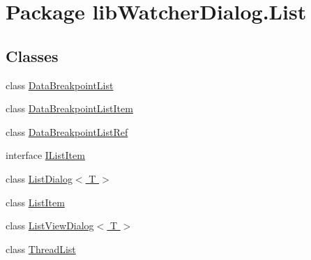 \hypertarget{namespacelib_watcher_dialog_1_1_list}{\section{Package lib\+Watcher\+Dialog.\+List}
\label{namespacelib_watcher_dialog_1_1_list}
}
\subsection*{Classes}
\begin{DoxyCompactItemize}
\item 
class \hyperlink{classlib_watcher_dialog_1_1_list_1_1_data_breakpoint_list}{Data\+Breakpoint\+List}
\item 
class \hyperlink{classlib_watcher_dialog_1_1_list_1_1_data_breakpoint_list_item}{Data\+Breakpoint\+List\+Item}
\item 
class \hyperlink{classlib_watcher_dialog_1_1_list_1_1_data_breakpoint_list_ref}{Data\+Breakpoint\+List\+Ref}
\item 
interface \hyperlink{interfacelib_watcher_dialog_1_1_list_1_1_i_list_item}{I\+List\+Item}
\item 
class \hyperlink{classlib_watcher_dialog_1_1_list_1_1_list_dialog_3_01_t_01_4}{List\+Dialog$<$ T $>$}
\item 
class \hyperlink{classlib_watcher_dialog_1_1_list_1_1_list_item}{List\+Item}
\item 
class \hyperlink{classlib_watcher_dialog_1_1_list_1_1_list_view_dialog_3_01_t_01_4}{List\+View\+Dialog$<$ T $>$}
\item 
class \hyperlink{classlib_watcher_dialog_1_1_list_1_1_thread_list}{Thread\+List}
\end{DoxyCompactItemize}
